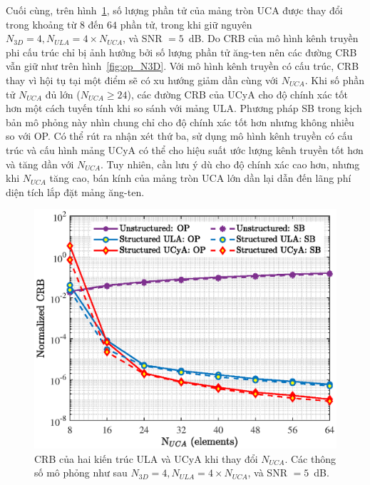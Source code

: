 Cuối cùng, trên hình~\ref{fig:op_NUCA}, số lượng phần tử của mảng tròn UCA được thay đổi trong khoảng từ $8$ đến $64$ phần tử, trong khi giữ nguyên $N_{3D} = 4, N_{ULA} = 4 \times N_{UCA}$, và SNR $=5$~dB. Do CRB của mô hình kênh truyền phi cấu trúc chỉ bị ảnh hưởng bởi số lượng phần tử ăng-ten nên các đường CRB vẫn giữ như trên hình~\ref{fig:op_N3D}. Với mô hình kênh truyền có cấu trúc, CRB thay vì hội tụ tại một điểm sẽ có xu hướng giảm dần cùng với $N_{UCA}$. Khi số phần tử $N_{UCA}$ đủ lớn ($N_{UCA} \ge 24$), các đường CRB của UCyA cho độ chính xác tốt hơn một cách tuyến tính khi so sánh với mảng ULA. Phương pháp SB trong kịch bản mô phỏng này nhìn chung chỉ cho độ chính xác tốt hơn nhưng không nhiều so với OP. Có thể rút ra nhận xét thứ ba, sử dụng mô hình kênh truyền có cấu trúc và cấu hình mảng UCyA có thể cho hiệu suất ước lượng kênh truyền tốt hơn và tăng dần với $N_{UCA}$. Tuy nhiên, cần lưu ý dù cho độ chính xác cao hơn, nhưng khi $N_{UCA}$ tăng cao, bán kính của mảng tròn UCA lớn dần lại dẫn đến lãng phí diện tích lắp đặt mảng ăng-ten.
\begin{figure}[ht]
    \centering
    \includegraphics[width=\linewidth]{figures/fig_3_3.eps}
    \caption{CRB của hai kiến trúc ULA và UCyA khi thay đổi $N_{UCA}$. Các thông số mô phỏng như sau $N_{3D} = 4, N_{ULA} = 4 \times N_{UCA}$, và SNR $=5$~dB.}
    \label{fig:op_NUCA}
\end{figure}

